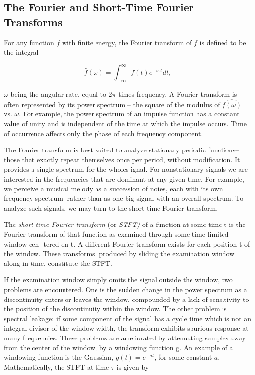 \documentclass[a4paper,12pt]{article}
\begin{document}
\subsection{The Fourier and Short-Time Fourier Transforms}

For any function \(f\) with finite energy, the Fourier transform of \(f\) is defined to be the integral

\[
\hat{f}(\omega) = \int_{-\infty}^{\infty}f(t)e^{-i \omega t} dt,
\]

\(\omega\) being the angular rate, equal to \(2\pi\) times frequency. A Fourier transform is often represented by its
power spectrum -- the square of the modulus of \(\hat{f(\omega)}\) vs. \(\omega\). For example, the power spectrum 
of an impulse function has a constant value of unity and is independent of the time at which the impulse occurs. Time of
occurrence affects only the phase of each frequency component.

The Fourier transform is best suited to analyze stationary periodic functions--those that exactly repeat themselves
once per period, without modification. It provides a single spectrum for the wholes ignal. For nonstationary signals
we are interested in the frequencies that are dominant at any given time. For example, we perceive a musical melody
as a succession of notes, each with its own frequency spectrum, rather than as one big signal with an overall spectrum.
To analyze such signals, we may turn to the short-time Fourier transform.

The \emph{short-time Fourier transform} (or \emph{STFT)} of a function at some time t is the Fourier transform of that
function as examined through some time-limited window cen- tered on t. A different Fourier transform exists for each
position t of the window. These transforms, produced by sliding the examination window along in time, constitute the
STFT.

If the examination window simply omits the signal outside the window, two problems are encountered. One is the sudden
change in the power spectrum as a discontinuity enters or leaves the window, compounded by a lack of sensitivity to the
position of the discontinuity within the window. The other problem is spectral leakage: if some component of the signal
has a cycle time which is not an integral divisor of the window width, the transform exhibits spurious response at many
frequencies. These problems are ameliorated by attenuating samples away from the center of the window, by a windowing
function g. An example of a windowing function is the Gaussian, \(g(t) = e^{-at}\), for some constant \(a\).
Mathematically, the STFT at time \(\tau\) is given by
\end{document}
